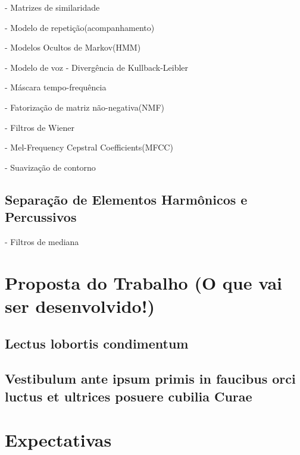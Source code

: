 \documentclass[
	12pt,				%
	openright,			%
	oneside,			%
	a4paper,			%
	english,			%
	brazil,				%
	]{abntex2}
\begin{document}
- Matrizes de similaridade 

- Modelo de repetição(acompanhamento) 

- Modelos Ocultos de Markov(HMM) 

- Modelo de voz 
    - Divergência de Kullback-Leibler 

- Máscara tempo-frequência 

- Fatorização de matriz não-negativa(NMF) 

- Filtros de Wiener 

- Mel-Frequency Cepstral Coefficients(MFCC) 

- Suavização de contorno 

\section{Separação de Elementos Harmônicos e Percussivos}

- Filtros de mediana 

\chapter[Proposta do Trabalho]{Proposta do Trabalho (O que vai ser desenvolvido!)}

\section{Lectus lobortis condimentum}

\section{Vestibulum ante ipsum primis in faucibus orci luctus et ultrices
posuere cubilia Curae}

\chapter[Expectativas]{Expectativas}
\end{document}
